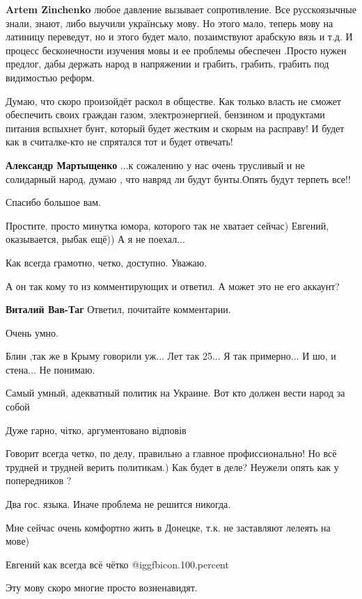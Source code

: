 \begin{itemize}
\begin{itemize} %
\textbf{Artem Zinchenko} любое давление вызывает сопротивление. Все русскоязычные знали, знают, либо выучили українську мову. Но этого мало, теперь мову на латиницу переведут, но и этого будет мало, позаимствуют арабскую вязь и т.д. И процесс бесконечности изучения мовы и ее проблемы обеспечен .Просто нужен предлог, дабы держать народ в напряжении и грабить, грабить, грабить под видимостью реформ.
\end{itemize} %


Думаю, что скоро произойдёт раскол в обществе. Как только власть не сможет
обеспечить своих граждан газом, электроэнергией, бензином и продуктами питания
вспыхнет бунт, который будет жестким и скорым на расправу! И будет как в
считалке-кто не спрятался тот и будет отвечать!

\begin{itemize} %
\textbf{Александр Мартыщенко} ...к сожалению у нас очень трусливый и не солидарный народ, думаю , что навряд ли будут бунты.Опять будут терпеть все!!
\end{itemize} %

Спасибо большое вам.

Простите, просто минутка юмора, которого так не хватает сейчас) Евгений, оказывается, рыбак ещё)) А я не поехал...

Как всегда грамотно, четко, доступно. Уважаю.

А он так кому то из комментирующих и ответил. А может это не его аккаунт?

\begin{itemize} %
\textbf{Виталий Вав-Таг} Ответил, почитайте комментарии.
\end{itemize} %

Очень умно.

Блин ,так же в Крыму говорили уж... Лет так 25... Я так примерно... И шо, и стена...
Не понимаю.

Самый умный, адекватный политик на Украине. Вот кто должен вести народ за собой

Дуже гарно, чітко, аргументовано відповів


Говорит всегда четко, по делу, правильно а главное профиссионально! Но всё
трудней и трудней верить политикам.) Как будет в деле? Неужели опять как у
попередников ?

Два гос. языка. Иначе проблема не решится никогда.

Мне сейчас очень комфортно жить в Донецке, т.к. не заставляют лелеять на мове)

Евгений как всегда всё чётко  @igg{fbicon.100.percent} 

Эту мову скоро многие просто возненавидят.


\end{itemize} %
